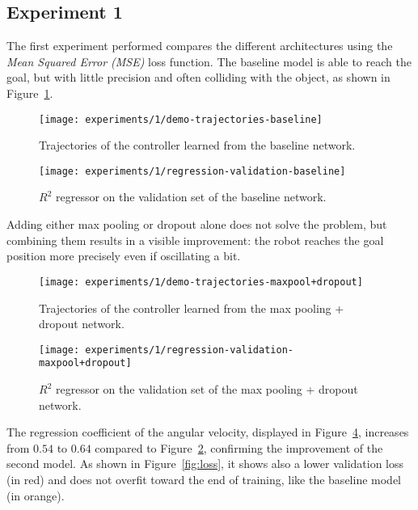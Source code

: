 \subsection{Experiment 1}
The first experiment performed compares the different architectures using the 
\emph{Mean Squared Error (MSE)} loss function.
The baseline model is able to reach the goal, but with little precision and 
often colliding with the object, as shown in Figure~\ref{fig:baseline}.

\begin{figure}[htbp]
	\centerline{\texttt{[image: experiments/1/demo-trajectories-baseline]}}
	\caption{Trajectories of the controller learned from the baseline network.}
	\label{fig:baseline}
\end{figure}

\begin{figure}[htbp]
	\centerline{\texttt{[image: experiments/1/regression-validation-baseline]}}
	\caption{$R^2$ regressor on the validation set of the baseline network.}
	\label{fig:regression-baseline}
\end{figure}

Adding either max pooling or dropout alone does not solve the problem, but 
combining them results in a visible improvement: the robot reaches the goal 
position more precisely even if oscillating a bit.

\begin{figure}[htbp]
	\centerline{\texttt{[image: experiments/1/demo-trajectories-maxpool+dropout]}}
	\caption{Trajectories of the controller learned from the max pooling + 
	dropout network.}
	\label{fig:maxpool+dropout}
\end{figure}

\begin{figure}[htbp]
	\centerline{\texttt{[image: experiments/1/regression-validation-maxpool+dropout]}}
	\caption{$R^2$ regressor on the validation set of the max pooling + dropout 
	network.}
	\label{fig:regression-maxpool+dropout}
\end{figure}

The regression coefficient of the angular velocity, displayed in 
Figure~\ref{fig:regression-maxpool+dropout}, increases from $0.54$ to $0.64$ 
compared to Figure~\ref{fig:regression-baseline}, confirming the improvement of 
the second model. As shown in Figure~\ref{fig:loss}, it shows also a lower 
validation loss (in red) and does not overfit toward the end of training, like 
the baseline model (in orange).

